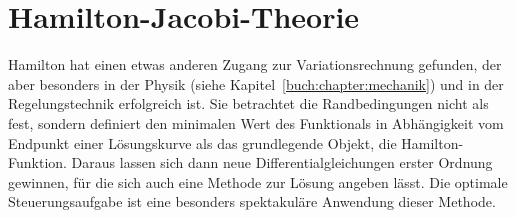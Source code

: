 %
%
%
\chapter{Hamilton-Jacobi-Theorie
\label{buch:chapter:hamiltonjacobi}}
Hamilton hat einen etwas anderen Zugang zur Variationsrechnung
gefunden, der aber besonders in der Physik (siehe
Kapitel~\ref{buch:chapter:mechanik}) und in der Regelungstechnik
erfolgreich ist.
Sie betrachtet die Randbedingungen nicht als fest, sondern definiert
den minimalen Wert des Funktionals in Abhängigkeit vom Endpunkt einer
Lösungskurve als das grundlegende Objekt, die Hamilton-Funktion.
Daraus lassen sich dann neue Differentialgleichungen erster Ordnung
gewinnen, für die sich auch eine Methode zur Lösung angeben lässt.
Die optimale Steuerungsaufgabe ist eine besonders spektakuläre 
Anwendung dieser Methode.





